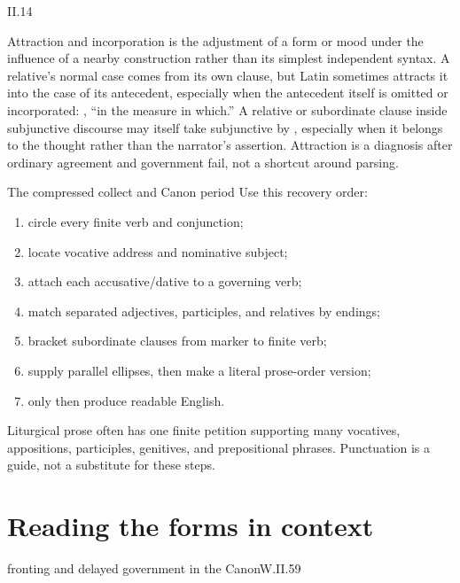 \begin{courseunit}{II.14}
\begin{grammarbox}{Attraction and incorporation}
 is the adjustment of a form or mood under the influence of a
nearby construction rather than its simplest independent syntax. A relative's
normal case comes from its own clause, but Latin sometimes attracts it into the
case of its antecedent, especially when the antecedent itself is omitted or incorporated:
, ``in the measure in which.''  A relative or subordinate clause inside
subjunctive discourse may itself take subjunctive by , especially when
it belongs to the thought rather than the narrator's assertion.  Attraction is a diagnosis
after ordinary agreement and government fail, not a shortcut around parsing.
\end{grammarbox}

\begin{grammarbox}{The compressed collect and Canon period}
Use this recovery order:
\begin{enumerate}
  \item circle every finite verb and conjunction;
  \item locate vocative address and nominative subject;
  \item attach each accusative/dative to a governing verb;
  \item match separated adjectives, participles, and relatives by endings;
  \item bracket subordinate clauses from marker to finite verb;
  \item supply parallel ellipses, then make a literal prose-order version;
  \item only then produce readable English.
\end{enumerate}
Liturgical prose often has one finite petition supporting many vocatives, appositions,
participles, genitives, and prepositional phrases.  Punctuation is a guide, not a substitute
for these steps.
\end{grammarbox}

\section{Reading the forms in context}

\begin{workedexample}{fronting and delayed government in the Canon}{W.II.59}


\end{workedexample}
\end{courseunit}
